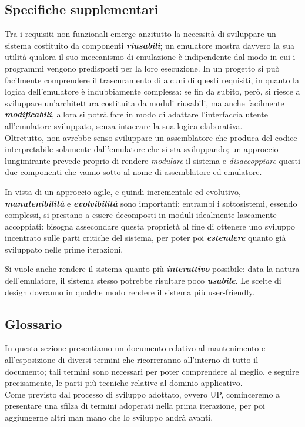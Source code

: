 \documentclass[11pt]{article}
\begin{document}
\subsection{Specifiche supplementari}
Tra i requisiti non-funzionali emerge anzitutto la necessità di sviluppare un sistema costituito da componenti \emph{\textbf{riusabili}}; un emulatore mostra davvero la sua utilità qualora il suo meccanismo di emulazione è indipendente dal modo in cui i programmi vengono predisposti per la loro esecuzione. In un progetto si può facilmente comprendere il trascuramento di alcuni di questi requisiti, in quanto la logica dell'emulatore è indubbiamente complessa: se fin da subito, però, si riesce a sviluppare un'architettura costituita da moduli riusabili, ma anche facilmente \emph{\textbf{modificabili}}, allora si potrà fare in modo di adattare l'interfaccia utente all'emulatore sviluppato, senza intaccare la sua logica elaborativa.\\
Oltretutto, non avrebbe senso sviluppare un assemblatore che produca del codice interpretabile solamente dall'emulatore che si sta sviluppando; un approccio lungimirante prevede proprio di rendere \emph{modulare} il sistema e \emph{disaccoppiare} questi due componenti che vanno sotto al nome di assemblatore ed emulatore.

In vista di un approccio agile, e quindi incrementale ed evolutivo, \emph{\textbf{manutenibilità}} e \emph{\textbf{evolvibilità}} sono importanti: entrambi i sottosistemi, essendo complessi, si prestano a essere decomposti in moduli idealmente lascamente accoppiati: bisogna assecondare questa proprietà al fine di ottenere uno sviluppo incentrato sulle parti critiche del sistema, per poter poi \emph{\textbf{estendere}} quanto già sviluppato nelle prime iterazioni.

Si vuole anche rendere il sistema quanto più \emph{\textbf{interattivo}} possibile: data la natura dell'emulatore, il sistema stesso potrebbe risultare poco \emph{\textbf{usabile}}. Le scelte di design dovranno in qualche modo rendere il sistema più user-friendly.
\clearpage
\subsection{Glossario}

In questa sezione presentiamo un documento relativo al mantenimento e all'esposizione di diversi termini che ricorreranno all'interno di tutto il documento; tali termini sono necessari per poter comprendere al meglio, e seguire precisamente, le parti più tecniche relative al dominio applicativo.\\
Come previsto dal processo di sviluppo adottato, ovvero UP, cominceremo a presentare una sfilza di termini adoperati nella prima iterazione, per poi aggiungerne altri man mano che lo sviluppo andrà avanti.
\end{document}
